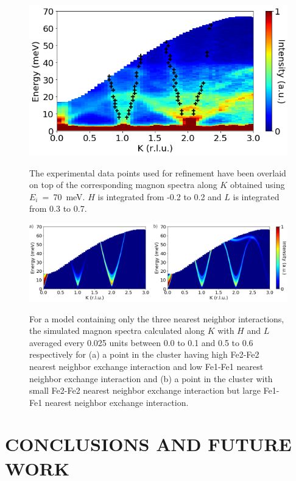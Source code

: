 \documentclass[10pt,doublespacing,edeposit]{uiucthesis2020}
\begin{document}
\begin{mainmatter}
\begin{figure}[h]
\centering\includegraphics[width=0.6\columnwidth]{figures/ch8/exp_data_points_0K0dot5.png} \\
\caption{\label{fig:exp_data_points_01L}
The experimental data points used for refinement have been overlaid on top of the corresponding magnon spectra along $K$ obtained using $E_i$~=~70~meV. $H$ is integrated from -0.2 to 0.2 and $L$ is integrated from 0.3 to 0.7.
} 
\end{figure}


\begin{figure}[h]
\centering\includegraphics[width=\columnwidth]{figures/ch8/suppl_simulated_magnon_spectra_3J.png} \\
\caption{\label{fig:3J_spinw_refinement}
For a model containing only the three nearest neighbor interactions, the simulated magnon spectra calculated along $K$ with $H$ and $L$ averaged every 0.025 units between 0.0 to 0.1 and 0.5 to 0.6 respectively for (a) a point in the cluster having high Fe2-Fe2 nearest neighbor exchange interaction and low Fe1-Fe1 nearest neighbor exchange interaction and (b) a point in the cluster with small Fe2-Fe2 nearest neighbor exchange interaction but large Fe1-Fe1 nearest neighbor exchange interaction.
}
\end{figure}


\chapter{CONCLUSIONS AND FUTURE WORK}


\end{mainmatter}
\end{document}
